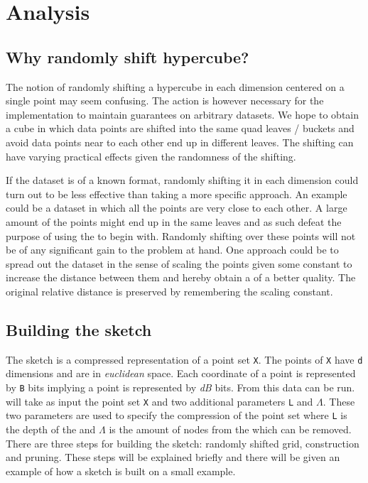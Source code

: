 \section{Analysis}
\label{analysis}

\subsection{Why randomly shift hypercube?}
The notion of randomly shifting a hypercube in each dimension centered on a single point may seem confusing. The action is however necessary for the \qs{} implementation to maintain guarantees on arbitrary datasets. We hope to obtain a cube in which data points are shifted into the same quad leaves / buckets and avoid data points near to each other end up in different leaves. The shifting can have varying practical effects given the randomness of the shifting.

If the dataset is of a known format, randomly shifting it in each dimension could turn out to be less effective than taking a more specific approach. An example could be a dataset in which all the points are very close to each other. A large amount of the points might end up in the same leaves and as such defeat the purpose of using the \qt{} to begin with. Randomly shifting over these points will not be of any significant gain to the problem at hand. One approach could be to spread out the dataset in the sense of scaling the points given some constant to increase the distance between them and hereby obtain a \qt{} of a better quality. The original relative distance is preserved by remembering the scaling constant.

\subsection{Building the sketch}
The sketch is a compressed representation of a point set \texttt{X}. The points of \texttt{X} have \texttt{d} dimensions and are in \textit{euclidean} space. Each coordinate of a point is represented by \texttt{B} bits implying a point is represented by \textit{dB} bits. From this data \qs{} can be run. \qs{} will take as input the point set \texttt{X} and two additional parameters \texttt{L} and $\Lambda$. These two parameters are used to specify the compression of the point set where \texttt{L} is the depth of the \qt{} and $\Lambda$ is the amount of nodes from the \qt{} which can be removed. There are three steps for building the sketch: randomly shifted grid, \qt{} construction and pruning. These steps will be explained briefly and there will be given an example of how a sketch is built on a small example.

